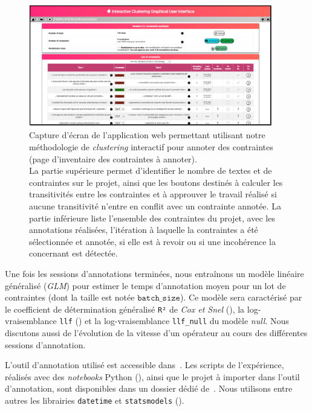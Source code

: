 			\begin{figure}[!htb]
				\centering
				\includegraphics[width=0.95\textwidth]{figures/etude-temps-annotation-0application-liste-contraintes}
				\caption{
					Capture d'écran de l'application web permettant utilisant notre méthodologie de \textit{clustering} interactif pour annoter des contraintes (page d'inventaire des contraintes à annoter).\\
					La partie supérieure permet d'identifier le nombre de textes et de contraintes sur le projet, ainsi que les boutons destinés à calculer les transitivités entre les contraintes et à approuver le travail réalisé si aucune transitivité n'entre en conflit avec un contrainte annotée. La partie inférieure liste l'ensemble des contraintes du projet, avec les annotations réalisées, l'itération à laquelle la contraintes a été sélectionnée et annotée, si elle est à revoir ou si une incohérence la concernant est détectée.
				}
				\label{figure:4.3.1-ETUDE-COUTS-TEMPS-ANNOTATION-APPLICATION-LISTE-CONTRAINTES}
			\end{figure}
			
			
			Une fois les sessions d'annotations terminées, nous entraînons un modèle linéaire généralisé (\textit{GLM}) pour estimer le temps d'annotation moyen pour un lot de contraintes (dont la taille est notée $\texttt{batch\_size}$).
			Ce modèle sera caractérisé par le coefficient de détermination généralisé \texttt{R²} de \textit{Cox et Snel} (\cite{diamond-etal:1990:analysis-binary-data}), la log-vraisemblance \texttt{llf} (\cite{edwards:1992:likelihood}) et la log-vraisemblance \texttt{llf\_null} du modèle \textit{null}.
			Nous discutons aussi de l'évolution de la vitesse d'un opérateur au cours des différentes sessions d'annotation.

			\begin{leftBarInformation}
				L'outil d'annotation utilisé est accessible dans~\cite{schild-etal:2022:cognitivefactory-interactiveclusteringgui}.
				Les scripts de l'expérience, réalisés avec des \textit{notebooks} Python (\cite{van-rossum-drake:2009:python-reference-manual}), ainsi que le projet à importer dans l'outil d'annotation, sont disponibles dans un dossier dédié de~\cite{schild:2021:cognitivefactory-interactiveclusteringcomparativestudy}.
				Nous utilisons entre autres les librairies \texttt{datetime} et \texttt{statsmodels} (\cite{seabold-perktold:2010:statsmodels-econometric-statistical}).
			\end{leftBarInformation}

